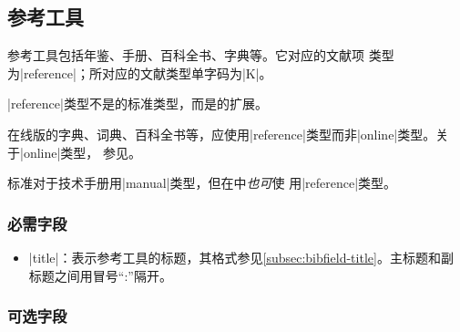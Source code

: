 
\subsection{参考工具}\label{subsec:bibtype-reference}

参考工具包括年鉴、手册、百科全书、字典等\cite{gbt3469-1983}。它对应的{\BibTeX}文献项
类型为|reference|；所对应的文献类型单字码为|K|\cite{gbt3469-1983}。

|reference|类型不是{\BibTeX}的标准类型，而是{\njuthesis}的扩展。

\begin{note}
在线版的字典、词典、百科全书等，应使用|reference|类型而非|online|类型。关于|online|类型，
参见\cite{subsec:bibtype-online}。
\end{note}

\begin{note}
标准{\BibTeX}对于技术手册用|manual|类型，但在{\njuthesis}中\emph{也可}使
用|reference|类型。
\end{note}

\subsubsection{必需字段}

\begin{itemize}
\item |title|：表示参考工具的标题，其格式参见\ref{subsec:bibfield-title}。主标题和副
  标题之间用冒号``:''隔开。
\end{itemize}

\subsubsection{可选字段}

